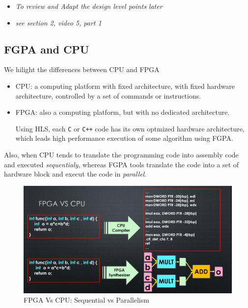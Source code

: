 \begin{itemize}

\item  \textit{To review and Adapt the design level points later}

\item \textit{see section 2, video 5, part 1}

\end{itemize}

\subsection{FGPA and CPU}

We hilight the differences between CPU and FPGA

\begin{itemize}

\item CPU: a computing platform with fixed architecture, with fixed hardware architecture, controlled by a set of commands or instructions.

\item FPGA: also a computing platform, but with no dedicated architecture.

Using HLS, each \verb|C| or \verb|C++| code has its own optmized hardware architecture, which leads high performance execution of some algorithm using FGPA.

\end{itemize}

\newpage
Also, when CPU tends to translate the programming code into assembly code and executed \textit{sequentialy}, whereas FGPA tools translate the code into a set of hardware block and execut the code in \textit{parallel}. 

\begin{figure}[h]
\centering
\includegraphics[scale=0.3,frame]{Figures/intro_hls/fgpa_vs_cpu_1}
\caption{FPGA Vs CPU: Sequential vs Parallelism}
\label{fig:intro_hls:fgpa_vs_cpu_1}
\end{figure}

